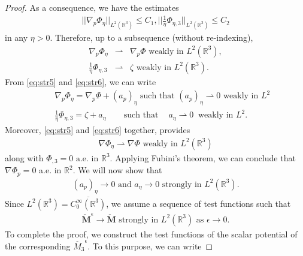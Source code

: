 \documentclass{article}
\def \Mvec{\mathbf{M}}
\begin{document}
\begin{proof}
As a consequence, we have the estimates
\begin{eqnarray}
||\nabla_p\Phi_{\eta}||_{L^2\left(\mathbb R^3\right)}\le C_1, \bigg|\bigg|\frac{1}{\eta}\Phi_{\eta,3}\bigg|\bigg|_{L^2\left(\mathbb R^3\right)}\le C_2\label{eq:str4}
\end{eqnarray}
in any $\eta>0$. Therefore, up to a subsequence (without re-indexing),
\begin{eqnarray}
\nabla_p\Phi_{\eta}&\rightharpoonup&\nabla_p\Phi \mbox{ weakly in } L^2\left(\mathbb R^3\right),\label{eq:str5}\\
\frac{1}{\eta}\Phi_{\eta,3}&\rightharpoonup& \zeta \mbox{ weakly in } L^2\left(\mathbb R^3\right).\label{eq:str6}
\end{eqnarray}
From \eqref{eq:str5} and \eqref{eq:str6}, we can write
\begin{eqnarray}
& &\nabla_p\Phi_{\eta}=\nabla_p\Phi+\left(a_p\right)_{\eta} \mbox{ such that } \left(a_p\right)_{\eta}\rightharpoonup 0 \mbox{ weakly in } L^2\label{eq:con_ap}\\
& &\frac{1}{\eta}\Phi_{\eta,3}=\zeta+a_{\eta}~~~~~~~~\mbox{ such that }~~~~ a_{\eta}\rightharpoonup 0~\mbox{ weakly in } L^2\label{eq:con_an}.
\end{eqnarray}
Moreover, \eqref{eq:str5} and \eqref{eq:str6} together, provides
\begin{eqnarray}
\nabla\Phi_{\eta}\rightharpoonup\nabla\Phi \mbox{ weakly in } L^2\left(\mathbb R^3\right)
\end{eqnarray}
along with $\Phi_{,3}=0 \mbox{ a.e. in } \mathbb R^3$. Applying Fubini's theorem, we can conclude that $\nabla\Phi_p=0$ a.e. in $\mathbb R^2$.
We will now show that
\begin{eqnarray}
\left(a_p\right)_{\eta}\rightarrow 0 \mbox{ and } a_{\eta}\rightarrow 0 \mbox{ strongly in } L^2\left(\mathbb R^3\right).\label{eq:a_p}
\end{eqnarray}
Since $L^2\left(\mathbb R^3\right)=\overline{C^{\infty}_{0}\left(\mathbb R^3\right)}$, we assume a sequence of test functions such that
\begin{eqnarray}
\check{\Mvec}^{\epsilon}\rightarrow\check{\Mvec} \mbox{ strongly in } L^2\left(\mathbb R^3\right) \mbox{ as } \epsilon\rightarrow 0.\label{eq:test_func}
\end{eqnarray}
To complete the proof, we construct the test functions of the scalar potential of the corresponding ${\check{M_3}}^{\epsilon}$. To this purpose, we can write

\end{proof}
\end{document}
